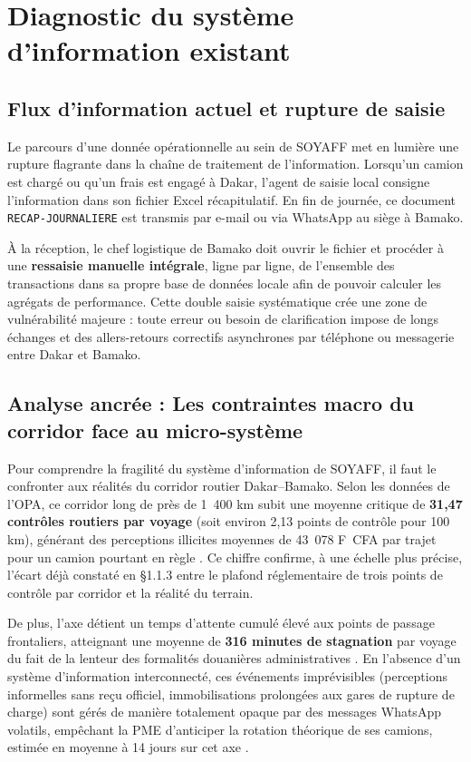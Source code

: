 \section{Diagnostic du système d'information existant}
\label{sec:diagnostic_si}

\subsection{Flux d'information actuel et rupture de saisie}
Le parcours d'une donnée opérationnelle au sein de SOYAFF met en lumière une rupture flagrante dans la chaîne de traitement de l'information. Lorsqu'un camion est chargé ou qu'un frais est engagé à Dakar, l'agent de saisie local consigne l'information dans son fichier Excel récapitulatif. En fin de journée, ce document \texttt{RECAP-JOURNALIERE} est transmis par e-mail ou via WhatsApp au siège à Bamako. 

À la réception, le chef logistique de Bamako doit ouvrir le fichier et procéder à une \textbf{ressaisie manuelle intégrale}, ligne par ligne, de l'ensemble des transactions dans sa propre base de données locale afin de pouvoir calculer les agrégats de performance. Cette double saisie systématique crée une zone de vulnérabilité majeure : toute erreur ou besoin de clarification impose de longs échanges et des allers-retours correctifs asynchrones par téléphone ou messagerie entre Dakar et Bamako.

\subsection{Analyse ancrée : Les contraintes macro du corridor face au micro-système}
Pour comprendre la fragilité du système d'information de SOYAFF, il faut le confronter aux réalités du corridor routier Dakar–Bamako. Selon les données de l'OPA, ce corridor long de près de 1~400 km subit une moyenne critique de \textbf{31,47 contrôles routiers par voyage} (soit environ 2,13 points de contrôle pour 100 km), générant des perceptions illicites moyennes de 43~078 F~CFA par trajet pour un camion pourtant en règle \cite{fix_kebeDiagnosticEntravesImportance2023}. Ce chiffre confirme, à une échelle plus précise, l'écart déjà constaté en §1.1.3 entre le plafond réglementaire de trois points de contrôle par corridor et la réalité du terrain.

De plus, l'axe détient un temps d'attente cumulé élevé aux points de passage frontaliers, atteignant une moyenne de \textbf{316 minutes de stagnation} par voyage du fait de la lenteur des formalités douanières administratives \cite{sigueTransportRoutierMarchandises2017}. En l'absence d'un système d'information interconnecté, ces événements imprévisibles (perceptions informelles sans reçu officiel, immobilisations prolongées aux gares de rupture de charge) sont gérés de manière totalement opaque par des messages WhatsApp volatils, empêchant la PME d'anticiper la rotation théorique de ses camions, estimée en moyenne à 14 jours sur cet axe \cite{sigueTransportRoutierMarchandises2017}.

